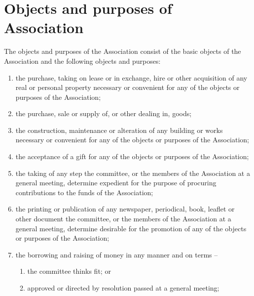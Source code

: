\section{Objects and purposes of Association}
\label{rule:objectsAndPurpose}

The objects and purposes of the Association consist of the basic objects of the Association and the following objects and purposes:
\begin{enumerate}
	\item the purchase, taking on lease or in exchange, hire or other acquisition of any real or personal property necessary or convenient for any of the objects or purposes of the Association;
	\item the purchase, sale or supply of, or other dealing in, goods;
	\item the construction, maintenance or alteration of any building or works necessary or convenient for any of the objects or purposes of the Association;
	\item the acceptance of a gift for any of the objects or purposes of the Association;
	\item the taking of any step the committee, or the members of the Association at a general meeting, determine expedient for the purpose of procuring contributions to the funds of the Association;
	\item the printing or publication of any newspaper, periodical, book, leaflet or other document the committee, or the members of the Association at a general meeting, determine desirable for the promotion of any of the objects or purposes of the Association;
	
	\item the borrowing and raising of money in any manner and on terms --
	\begin{enumerate}
		\item the committee thinks fit; or
		\item approved or directed by resolution passed at a general meeting;
	\end{enumerate}
	

\end{enumerate}

